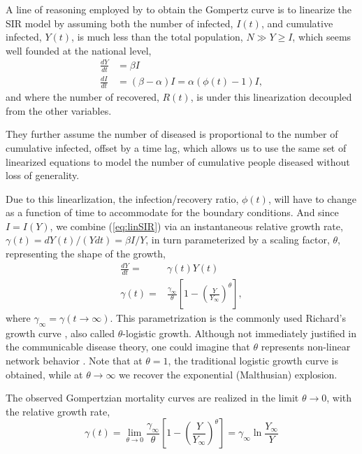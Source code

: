 \documentclass[review]{elsarticle}
\begin{document}
A line of reasoning employed by \citet{Rypdal2020} to obtain the Gompertz curve is to linearize the SIR model by assuming
both the number of infected, $I(t)$, and cumulative infected, $Y(t)$, is much less than the total population, $N \gg Y \ge I$, which seems well founded at the national level,
\begin{align}
\label{eq:linSIR}
\frac{dY}{dt}& = \beta I\\
\frac{dI}{dt}& = (\beta - \alpha) I = \alpha (\phi(t) - 1) I,
\end{align}
and where the number of recovered, $R(t)$, is under this linearization decoupled from the other variables. 

They further assume the number of diseased is proportional to the number of cumulative infected, offset by a time lag, which allows us to use the same set of linearized equations to model the number of cumulative people diseased without loss of generality.

 Due to this linearlization, the infection/recovery ratio, $\phi(t)$, will have to change as a function of time to accommodate for the boundary conditions. And since $I=I(Y)$, we combine (\ref{eq:linSIR}) via an instantaneous relative growth rate, $\gamma(t) = dY(t) /(Ydt) = \beta I / Y$, in turn parameterized by a scaling factor, $\theta$, representing the shape of the growth,
\begin{subequations}
\label{eq:rypdal}
\begin{align}
\frac{dY}{dt} =& \gamma(t) Y(t) \label{eq:rypdalODE}\\
\gamma(t) =& \frac{\gamma_{\infty}}{\theta}\left[1 - \left(\frac{Y}{Y_{\infty}}\right)^{\theta} \right] \label{eq:rypdalGamma},
\end{align}
\end{subequations}
where $\gamma_{\infty} = \gamma(t\rightarrow \infty)$. This parametrization is the commonly used Richard's growth curve \citep{richards1959flexible}, also called $\theta$-logistic growth. Although not immediately justified in the communicable disease theory, one could imagine that $\theta$ represents non-linear network behavior \citep{petroni2020logistic}. Note that at $\theta=1$, the traditional logistic growth curve is obtained, while at $\theta\rightarrow \infty$ we recover the exponential (Malthusian) explosion.

The observed Gompertzian mortality curves are realized in the limit $\theta \rightarrow 0$, with the relative growth rate, 
\begin{equation}
\label{eq:rypdalLimit}
\gamma(t) = \lim_{\theta \rightarrow 0}\frac{\gamma_{\infty}}{\theta}\left[1 - \left(\frac{Y}{Y_{\infty}}\right)^{\theta} \right]
= \gamma_{\infty}\ln{\frac{Y_{\infty}}{Y}}
\end{equation}
\end{document}
